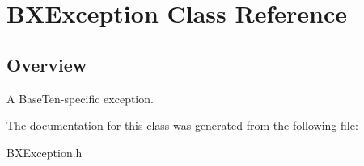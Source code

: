 \hypertarget{interface_b_x_exception}{}\section{B\+X\+Exception Class Reference}
\label{interface_b_x_exception}


\subsection{Overview}
A Base\+Ten-\/specific exception. 

The documentation for this class was generated from the following file\+:\begin{DoxyCompactItemize}
\item 
B\+X\+Exception.\+h\end{DoxyCompactItemize}
